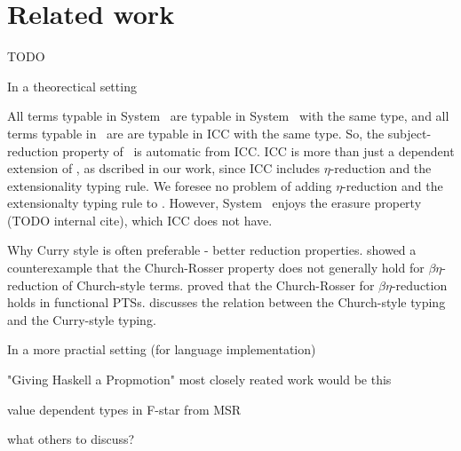 \section{Related work}
\label{sec:relwork}
TODO

In a theorectical setting

All terms typable in System \Fw\ are typable in System \Fi\ with the same type,
and all terms typable in \Fi\ are are typable in ICC with the same type.
So, the subject-reduction property of \Fi\ is automatic from ICC.
ICC\cite{Miquel01} is more than just a dependent extension of \Fi,
as dscribed in our work, since ICC includes $\eta$-reduction and
the extensionality typing rule. We foresee no problem of adding
$\eta$-reduction and the extensionalty typing rule to \Fi.
However, System \Fi\ enjoys the erasure property (TODO internal cite),
which ICC does not have.

Why Curry style is often preferable - better reduction properties.
\citet{Nederpelt73} showed a counterexample that the Church-Rosser property
does not generally hold for $\beta\eta$-reduction of Church-style terms.
\citet{Geuvers92} proved that the Church-Rosser for $\beta\eta$-reduction
holds in functional PTSs. \citet{Seldin08} discusses the relation between
the Church-style typing and the Curry-style typing. 


In a more practial setting (for language implementation)

"Giving Haskell a Propmotion" \cite{YorgeyWCJVM12}
most closely reated work would be this

value dependent types in F-star \cite{Swamy11} from MSR


what others to discuss?

